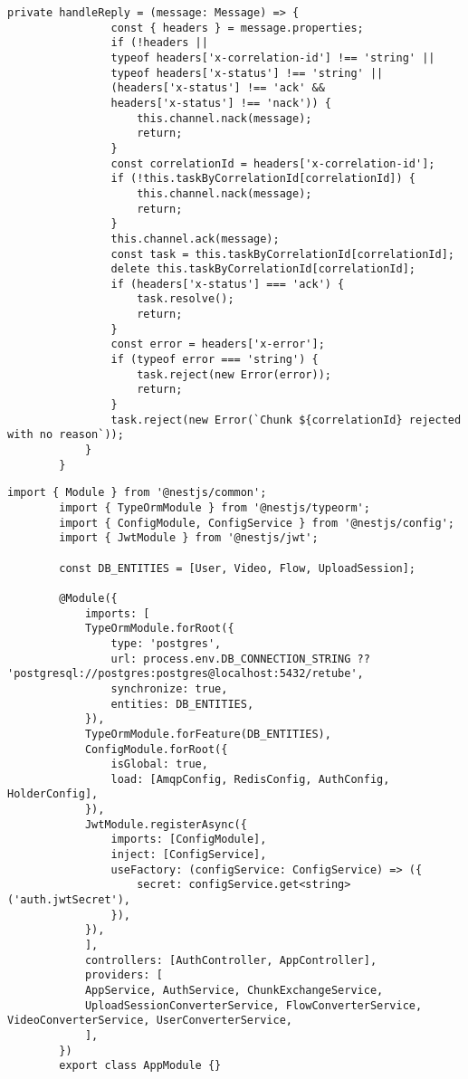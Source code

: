 \begin{lstlisting}[caption={chunk-exchange.service.ts}]
	 		private handleReply = (message: Message) => {
	 			const { headers } = message.properties;
	 			if (!headers ||
	 			typeof headers['x-correlation-id'] !== 'string' ||
	 			typeof headers['x-status'] !== 'string' ||
	 			(headers['x-status'] !== 'ack' &&
	 			headers['x-status'] !== 'nack')) {
	 				this.channel.nack(message);
	 				return;
	 			}
	 			const correlationId = headers['x-correlation-id'];
	 			if (!this.taskByCorrelationId[correlationId]) {
	 				this.channel.nack(message);
	 				return;
	 			}
	 			this.channel.ack(message);
	 			const task = this.taskByCorrelationId[correlationId];
	 			delete this.taskByCorrelationId[correlationId];
	 			if (headers['x-status'] === 'ack') {
	 				task.resolve();
	 				return;
	 			}
	 			const error = headers['x-error'];
	 			if (typeof error === 'string') {
	 				task.reject(new Error(error));
	 				return;
	 			}
	 			task.reject(new Error(`Chunk ${correlationId} rejected with no reason`));
	 		}
	 	}
	 \end{lstlisting}

	 \begin{lstlisting}[caption={app.module.ts}]
	 	import { Module } from '@nestjs/common';
	 	import { TypeOrmModule } from '@nestjs/typeorm';
	 	import { ConfigModule, ConfigService } from '@nestjs/config';
	 	import { JwtModule } from '@nestjs/jwt';
	 	
	 	const DB_ENTITIES = [User, Video, Flow, UploadSession];
	 	
	 	@Module({
	 		imports: [
	 		TypeOrmModule.forRoot({
	 			type: 'postgres',
	 			url: process.env.DB_CONNECTION_STRING ?? 'postgresql://postgres:postgres@localhost:5432/retube',
	 			synchronize: true,
	 			entities: DB_ENTITIES,
	 		}),
	 		TypeOrmModule.forFeature(DB_ENTITIES),
	 		ConfigModule.forRoot({
	 			isGlobal: true,
	 			load: [AmqpConfig, RedisConfig, AuthConfig, HolderConfig],
	 		}),
	 		JwtModule.registerAsync({
	 			imports: [ConfigModule],
	 			inject: [ConfigService],
	 			useFactory: (configService: ConfigService) => ({
	 				secret: configService.get<string>('auth.jwtSecret'),
	 			}),
	 		}),
	 		],
	 		controllers: [AuthController, AppController],
	 		providers: [
	 		AppService, AuthService, ChunkExchangeService,
	 		UploadSessionConverterService, FlowConverterService, VideoConverterService, UserConverterService,
	 		],
	 	})
	 	export class AppModule {}
	 \end{lstlisting}